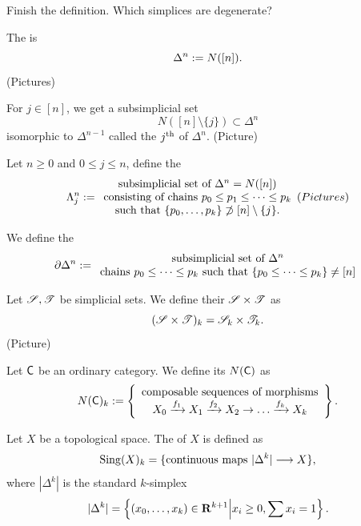 \begin{exercise}
	Finish the definition. Which simplices are degenerate?
\end{exercise}
\begin{example}
	The  is
	\[
		\Delta^{n} := N([n]).
	\]
	(Pictures)
\end{example}
\begin{note}
	For $j\in [n]$, we get a subsimplicial set
	\[
		N([n]\setminus \{j\} ) \subset \Delta^{n}
	\]
	isomorphic to $\Delta^{n-1}$ called the $j^\text{th}$  of $\Delta^{n}$. (Picture)
\end{note}
\begin{example}[Horns]
	Let $n\ge 0$ and $0\le j\le n$, define the 
	\[
		\Lambda^{n}_j :=
		\begin{array}{c}
			\text{subsimplicial set of }\Delta^{n} = N([n]) \\
			\text{consisting of chains }p_0\le p_1\le \dots\le p_k \\
			\text{such that } \{p_0,\dots,p_k\} \not\supset [n] \setminus \{j\} .
		\end{array}
		(Pictures)
	\]
\end{example}
\begin{example}
	We define the 
	\[
		\partial \Delta^{n} :=
		\begin{array}{c}
			\text{subsimplicial set of }\Delta^{n} \\
			\text{chains }p_0\le \dots \le p_k\text{ such that }\{p_0\le \dots\le p_k\} \neq [n]
		\end{array}
	\]
\end{example}
\begin{example}[Products]
	Let $\mathscr S,\mathscr T$ be simplicial sets. We define their  $\mathscr S\times \mathscr T$ as
	\[
		(\mathscr S\times \mathscr T)_k = \mathscr S_k \times \mathscr T_k.
	\]
	(Picture)
\end{example}
\begin{example}
	Let $\mathsf{C}$ be an ordinary category. We define its  $N(\mathsf{C})$ as
	\[
		N(\C)_k \defeq \left\{
			\begin{array}{c}
				\text{composable sequences of morphisms} \\
				X_0 \xrightarrow{f_1} X_1\xrightarrow{f_2}X_2\to \dots\xrightarrow{f_k} X_k
		\end{array}\right\} .
	\]
\end{example}
\begin{example}
	Let $X$ be a topological space. The  of $X$ is defined as
	\[
		\Sing(X)_k = \{\text{continuous maps }|\Delta^{k}|\to X\} ,
	\]
	where $|\Delta^{k}|$ is the standard $k$-simplex
	\[
		|\Delta^{k}| = \left\{ (x_0,\dots,x_k)\in \mathbf{R}^{k+1} \middle| x_i\ge 0, \sum x_i=1 \right\} .
	\]
\end{example}
